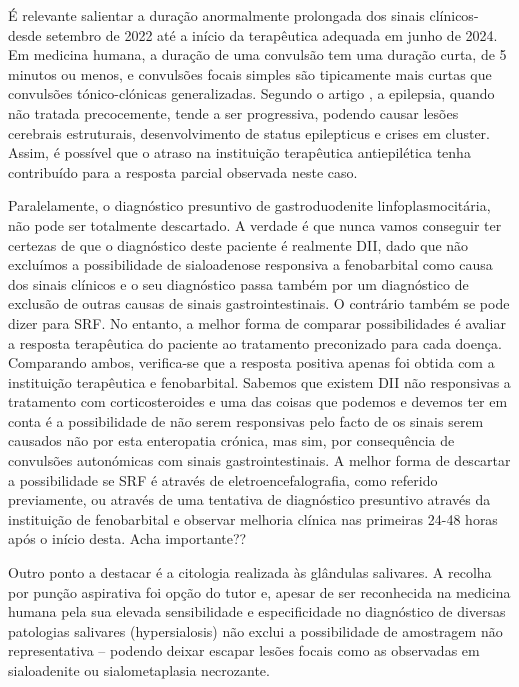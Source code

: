É relevante salientar a duração anormalmente prolongada dos sinais clínicos-desde setembro de 2022 até a início da terapêutica adequada em junho de 2024. Em medicina humana, a duração de uma convulsão tem uma duração curta, de 5 minutos ou menos, e convulsões focais simples são tipicamente mais curtas que convulsões tónico-clónicas generalizadas. \cite{Diop2025}  Segundo o artigo \cite{Diop2025}, a epilepsia, quando não tratada precocemente, tende a ser progressiva, podendo causar lesões cerebrais estruturais, desenvolvimento de status epilepticus e crises em cluster. \cite{Diop2025}  Assim, é possível que o atraso na instituição terapêutica antiepilética tenha contribuído para a resposta parcial observada neste caso.


Paralelamente, o diagnóstico presuntivo de gastroduodenite linfoplasmocitária, não pode ser totalmente descartado. A verdade é que nunca vamos conseguir ter certezas de que o diagnóstico deste paciente é realmente DII, dado que não excluímos a possibilidade de sialoadenose responsiva a fenobarbital como causa dos sinais clínicos e o seu diagnóstico passa também por um diagnóstico de exclusão de outras causas de sinais gastrointestinais. O contrário também se pode dizer para SRF. No entanto, a melhor forma de comparar possibilidades é avaliar a resposta terapêutica do paciente ao tratamento preconizado para cada doença. Comparando ambos, verifica-se que a resposta positiva apenas foi obtida com a instituição terapêutica e fenobarbital. Sabemos que existem DII não responsivas a tratamento com corticosteroides e uma das coisas que podemos e devemos ter em conta é a possibilidade de não serem responsivas pelo facto de os sinais serem causados não por esta enteropatia crónica, mas sim, por consequência de convulsões autonómicas com sinais gastrointestinais. A melhor forma de descartar a possibilidade se SRF é através de eletroencefalografia, como referido previamente, ou através de uma tentativa de diagnóstico presuntivo através da instituição de fenobarbital e observar melhoria clínica nas primeiras 24-48 horas após o início desta. Acha importante??


Outro ponto a destacar é a citologia realizada às glândulas salivares. A recolha por punção aspirativa foi opção do tutor e, apesar de ser reconhecida na medicina humana pela sua elevada sensibilidade e especificidade no diagnóstico de diversas patologias salivares (hypersialosis) não exclui a possibilidade de amostragem não representativa – podendo deixar escapar lesões focais como as observadas em sialoadenite ou sialometaplasia necrozante.


